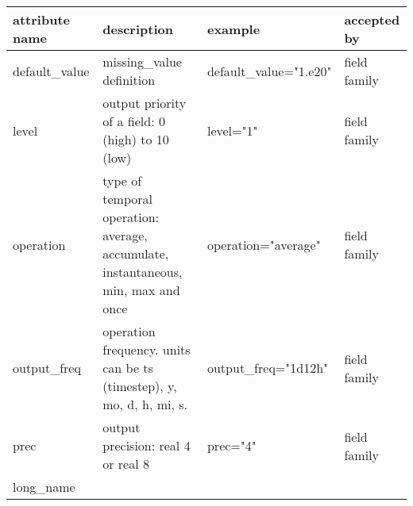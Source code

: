\documentclass[../tex_main/NEMO_manual]{subfiles}
\begin{document}
\begin{table} \scriptsize
	\begin{tabularx}{\textwidth}{|l|X|l|l|} \hline
		attribute name                                                                                       &
		description                                                                                          &
		example                                                                                              &
		accepted by                            \\ \hline \hline
		default\_value                                                                                       &
		missing\_value definition                                                                            &
		default\_value="1.e20"                                                                               &
		field family                           \\ \hline
		level                                                                                                &
		output priority of a field: 0 (high) to 10 (low)                                                     &
		level="1"                                                                                            &
		field family                           \\ \hline
		operation                                                                                            &
		type of temporal operation: average, accumulate, instantaneous, min, max and once                    &
		operation="average"                                                                                  &
		field family                           \\ \hline
		output\_freq                                                                                         &
		operation frequency. units can be ts (timestep), y, mo, d, h, mi, s.                                 &
		output\_freq="1d12h"                                                                                 &
		field family                           \\ \hline
		prec                                                                                                 &
		output precision: real 4 or real 8                                                                   &
		prec="4"                                                                                             &
		field family                           \\ \hline
		long\_name                                                                                           &

\end{tabularx}
\end{table}
\end{document}
